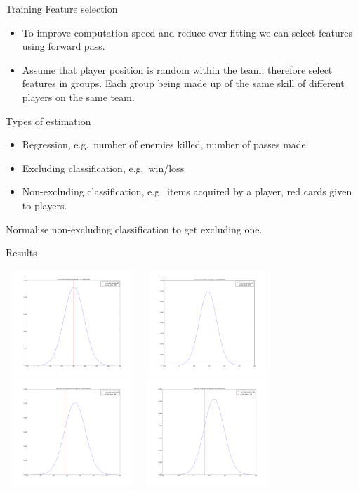 \documentclass{beamer}
\begin{document}
\begin{frame}{Training}
Feature selection
\begin{itemize}
\item To improve computation speed and reduce over-fitting we can select features using forward pass.
\item Assume that player position is random within the team, therefore select features in groups. Each group being made up of the same skill of different players on the same team.
\end{itemize}
Types of estimation
\begin{itemize}
\item Regression, e.g.\ number of enemies killed, number of passes made
\item Excluding classification, e.g.\ win/loss
\item Non-excluding classification, e.g.\ items acquired by a player, red cards given to players.
\end{itemize}
Normalise non-excluding classification to get excluding one.
\end{frame}


\begin{frame}{Results}
\begin{center}
\includegraphics[width=5cm,height=4cm]{XPM_player_0_TI}
\includegraphics[width=5cm,height=4cm]{XPM_player_7_TI}
\newline{}
\includegraphics[width=5cm,height=4cm]{GPM_player_1_TI}
\includegraphics[width=5cm,height=4cm]{CS_player_6_TI}
\end{center}
\end{frame}
\end{document}
